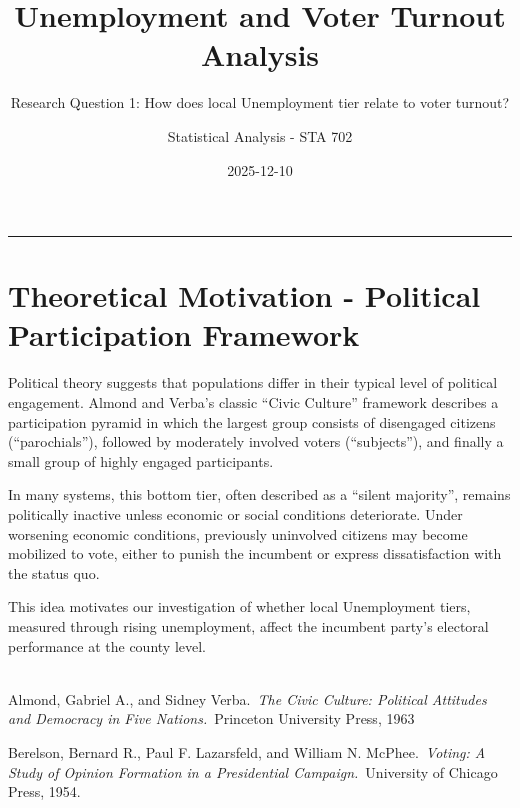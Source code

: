 \documentclass[
  11pt,
]{article}
\title{Unemployment and Voter Turnout Analysis}
\subtitle{Research Question 1: How does local Unemployment tier relate
to voter turnout?}
\author{Statistical Analysis - STA 702}
\date{2025-12-10}
\renewcommand*\contentsname{Table of contents}
\newcommand\contentsname{Table of contents}
\begin{document}
\maketitle

\renewcommand*\contentsname{Table of contents}
{
\hypersetup{linkcolor=}
\setcounter{tocdepth}{3}
\tableofcontents
}

\begin{center}\rule{0.5\linewidth}{0.5pt}\end{center}

\section{\texorpdfstring{\textbf{Theoretical Motivation - Political
Participation
Framework}}{Theoretical Motivation - Political Participation Framework}}\label{theoretical-motivation---political-participation-framework}

Political theory suggests that populations differ in their typical level
of political engagement. Almond and Verba's classic ``Civic Culture''
framework describes a participation pyramid in which the largest group
consists of disengaged citizens (``parochials''), followed by moderately
involved voters (``subjects''), and finally a small group of highly
engaged participants.

In many systems, this bottom tier, often described as a ``silent
majority'', remains politically inactive unless economic or social
conditions deteriorate. Under worsening economic conditions, previously
uninvolved citizens may become mobilized to vote, either to punish the
incumbent or express dissatisfaction with the status quo.

This idea motivates our investigation of whether local Unemployment
tiers, measured through rising unemployment, affect the incumbent
party's electoral performance at the county level.\\
\strut \\
Almond, Gabriel A., and Sidney Verba.~\emph{The Civic Culture: Political
Attitudes and Democracy in Five Nations.}~Princeton University Press,
1963

Berelson, Bernard R., Paul F. Lazarsfeld, and William N.
McPhee.~\emph{Voting: A Study of Opinion Formation in a Presidential
Campaign.}~University of Chicago Press, 1954.
\end{document}
